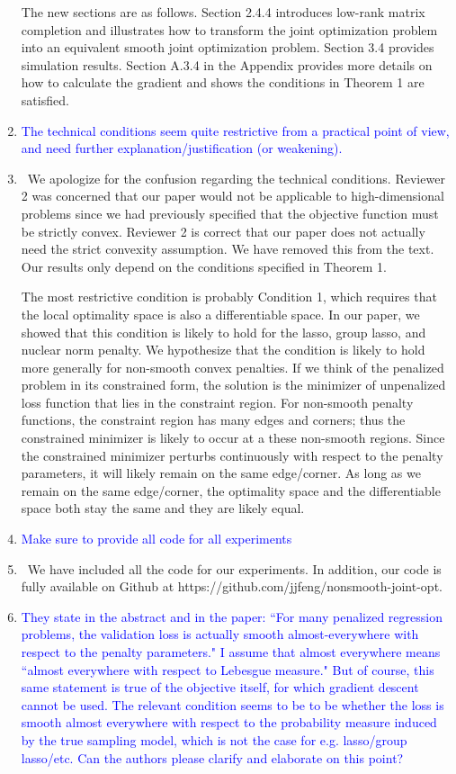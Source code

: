 \documentclass[]{article}
\newcommand{\point}[1]{\item \textcolor{blue}{#1}}
\newcommand{\reply}{\item[]\ }
\begin{document}
\begin{enumerate}
		The new sections are as follows. Section 2.4.4 introduces low-rank matrix completion and illustrates how to transform the joint optimization problem into an equivalent smooth joint optimization problem. Section 3.4 provides simulation results. Section A.3.4 in the Appendix provides more details on how to calculate the gradient and shows the conditions in Theorem 1 are satisfied. 
		
		
		\point{The technical conditions seem quite restrictive from a practical point of view, and need further explanation/justification (or weakening).}
		
		\reply We apologize for the confusion regarding the technical conditions. Reviewer 2 was concerned that our paper would not be applicable to high-dimensional problems since we had previously specified that the objective function must be strictly convex. Reviewer 2 is correct that our paper does not actually need the strict convexity assumption. We have removed this from the text. Our results only depend on the conditions specified in Theorem 1. 
		
		The most restrictive condition is probably Condition 1, which requires that the local optimality space is also a differentiable space. In our paper, we showed that this condition is likely to hold for the lasso, group lasso, and nuclear norm penalty. We hypothesize that the condition is likely to hold more generally for non-smooth convex penalties. If we think of the penalized problem in its constrained form, the solution is the minimizer of unpenalized loss function that lies in the constraint region. For non-smooth penalty functions, the constraint region has many edges and corners; thus the constrained minimizer is likely to occur at a these non-smooth regions. Since the constrained minimizer perturbs continuously with respect to the penalty parameters, it will likely remain on the same edge/corner. As long as we remain on the same edge/corner, the optimality space and the differentiable space both stay the same and they are likely equal.
		
		\point{Make sure to provide all code for all experiments}
		
		\reply We have included all the code for our experiments. In addition, our code is fully available on Github at https://github.com/jjfeng/nonsmooth-joint-opt.
		
		\point{They state in the abstract and in the paper: ``For many penalized regression problems, the validation loss is actually smooth almost-everywhere with respect to the penalty parameters."  I assume that almost everywhere means ``almost everywhere with respect to Lebesgue measure."  But of course, this same statement is true of the objective itself, for which gradient descent cannot be used.  The relevant condition seems to be to be whether the loss is smooth almost everywhere with respect to the probability measure induced by the true sampling model, which is not the case for e.g. lasso/group lasso/etc.  Can the authors please clarify and elaborate on this point?}
		

\end{enumerate}
\end{document}
